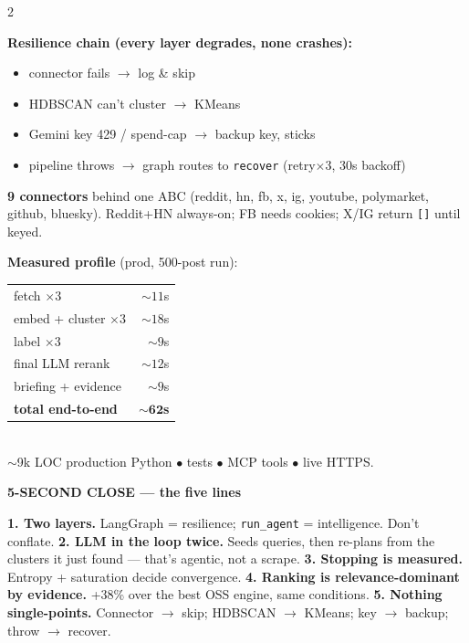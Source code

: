 \documentclass[10pt,a4paper]{article}
\newcommand{\code}[1]{\texttt{\small #1}}
\newcommand{\band}[2]{%
  \vspace{1pt}\noindent\colorbox{#1}{\begin{minipage}{\dimexpr\linewidth-2\fboxsep}%
  \color{white}\bfseries\small #2\end{minipage}}\par\vspace{0pt}}
\begin{document}
\begin{multicols}{2}
{\footnotesize
\textbf{Resilience chain (every layer degrades, none crashes):}
\begin{itemize}
\item connector fails $\rightarrow$ log \& skip
\item HDBSCAN can't cluster $\rightarrow$ KMeans
\item Gemini key 429 / spend-cap $\rightarrow$ backup key, sticks
\item pipeline throws $\rightarrow$ graph routes to \code{recover} (retry$\times$3, 30s backoff)
\end{itemize}
\textbf{9 connectors} behind one ABC (reddit, hn, fb, x, ig, youtube, polymarket, github, bluesky). Reddit+HN always-on; FB needs cookies; X/IG return \code{[]} until keyed.}

\columnbreak

{\footnotesize
\textbf{Measured profile} (prod, 500-post run):\\[2pt]
\begin{tabular}{@{}lr@{}}
fetch $\times3$ & $\sim11$s\\
embed + cluster $\times3$ & $\sim18$s\\
label $\times3$ & $\sim9$s\\
final LLM rerank & $\sim12$s\\
briefing + evidence & $\sim9$s\\[1pt]
\textbf{total end-to-end} & $\sim\mathbf{62}$\textbf{s}\\
\end{tabular}\\[3pt]
$\sim$9k LOC production Python \;$\bullet$ tests \;$\bullet$ MCP tools \;$\bullet$\; live HTTPS.}
\end{multicols}

\band{ink}{5-SECOND CLOSE — the five lines}

{\footnotesize
\textbf{1. Two layers.} LangGraph = resilience; \code{run\_agent} = intelligence. Don't conflate.\quad
\textbf{2. LLM in the loop twice.} Seeds queries, then re-plans from the clusters it just found — that's agentic, not a scrape.\quad
\textbf{3. Stopping is measured.} Entropy + saturation decide convergence.\quad
\textbf{4. Ranking is relevance-dominant by evidence.} +38\% over the best OSS engine, same conditions.\quad
\textbf{5. Nothing single-points.} Connector $\to$ skip; HDBSCAN $\to$ KMeans; key $\to$ backup; throw $\to$ recover.}
\end{document}
